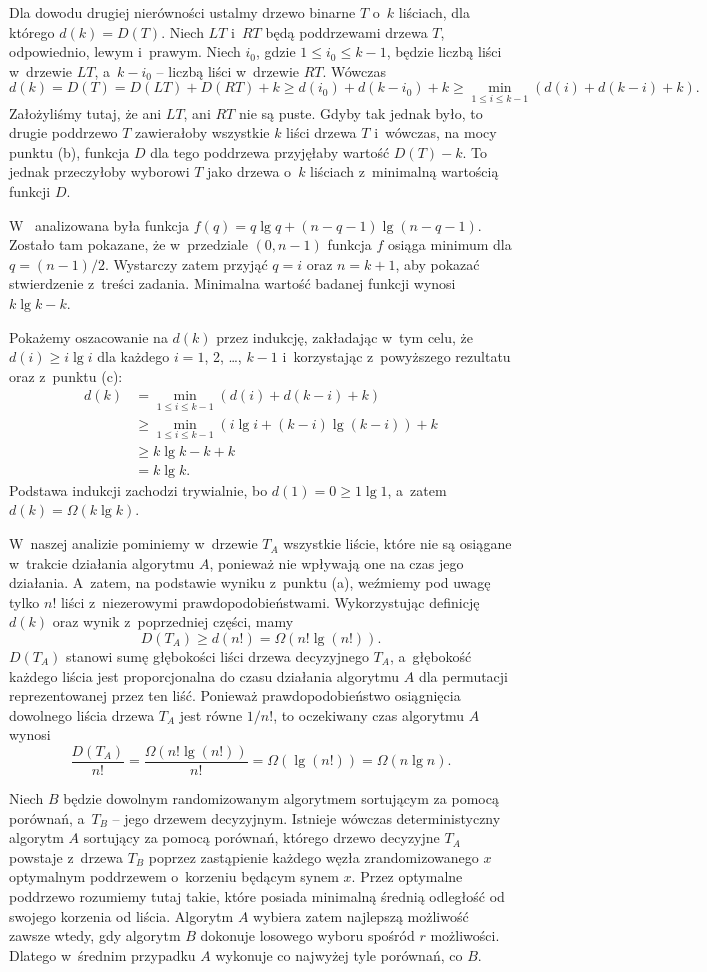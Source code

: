 Dla dowodu drugiej nierówności ustalmy drzewo binarne $T$ o~$k$ liściach, dla którego $d(k)=D(T)$.
Niech $LT$ i~$RT$ będą poddrzewami drzewa $T$, odpowiednio, lewym i~prawym.
Niech $i_0$, gdzie $1\le i_0\le k-1$, będzie liczbą liści w~drzewie $LT$, a~$k-i_0$ -- liczbą liści w~drzewie $RT$.
Wówczas
\[
    d(k) = D(T) = D(LT)+D(RT)+k \ge d(i_0)+d(k-i_0)+k \ge \min_{1\le i\le k-1}(d(i)+d(k-i)+k).
\]
Założyliśmy tutaj, że ani $LT$, ani $RT$ nie są puste.
Gdyby tak jednak było, to drugie poddrzewo $T$ zawierałoby wszystkie $k$ liści drzewa $T$ i~wówczas, na mocy punktu (b), funkcja $D$ dla tego poddrzewa przyjęłaby wartość $D(T)-k$.
To jednak przeczyłoby wyborowi $T$ jako drzewa o~$k$ liściach z~minimalną wartością funkcji $D$.

\subproblem %
W~ analizowana była funkcja $f(q)=q\lg q+(n-q-1)\lg(n-q-1)$.
Zostało tam pokazane, że w~przedziale $(0,n-1)$ funkcja $f$ osiąga minimum dla $q=(n-1)/2$.
Wystarczy zatem przyjąć $q=i$ oraz $n=k+1$, aby pokazać stwierdzenie z~treści zadania.
Minimalna wartość badanej funkcji wynosi $k\lg k-k$.

Pokażemy oszacowanie na $d(k)$ przez indukcję, zakładając w~tym celu, że $d(i)\ge i\lg i$ dla każdego $i=1$, 2, \dots, $k-1$ i~korzystając z~powyższego rezultatu oraz z~punktu (c):
\begin{align*}
	d(k) &= \min_{1\le i\le k-1}(d(i)+d(k-i)+k) \\
	&\ge \min_{1\le i\le k-1}(i\lg i+(k-i)\lg(k-i))+k \\
	&\ge k\lg k-k+k \\
	&= k\lg k.
\end{align*}
Podstawa indukcji zachodzi trywialnie, bo $d(1)=0\ge 1\lg1$, a~zatem $d(k)=\Omega(k\lg k)$.

\subproblem %
W~naszej analizie pominiemy w~drzewie $T_A$ wszystkie liście, które nie są osiągane w~trakcie działania algorytmu $A$, ponieważ nie wpływają one na czas jego działania.
A~zatem, na podstawie wyniku z~punktu (a), weźmiemy pod uwagę tylko $n!$ liści z~niezerowymi prawdopodobieństwami.
Wykorzystując definicję $d(k)$ oraz wynik z~poprzedniej części, mamy
\[
	D(T_A) \ge d(n!) = \Omega(n!\lg(n!)).
\]
$D(T_A)$ stanowi sumę głębokości liści drzewa decyzyjnego $T_A$, a~głębokość każdego liścia jest proporcjonalna do czasu działania algorytmu $A$ dla permutacji reprezentowanej przez ten liść.
Ponieważ prawdopodobieństwo osiągnięcia dowolnego liścia drzewa $T_A$ jest równe $1/n!$, to oczekiwany czas algorytmu $A$ wynosi
\[
	\frac{D(T_A)}{n!} = \frac{\Omega(n!\lg(n!))}{n!} = \Omega(\lg(n!)) = \Omega(n\lg n).
\]

\subproblem %
Niech $B$ będzie dowolnym randomizowanym algorytmem sortującym za pomocą porównań, a~$T_B$ -- jego drzewem decyzyjnym.
Istnieje wówczas deterministyczny algorytm $A$ sortujący za pomocą porównań, którego drzewo decyzyjne $T_A$ powstaje z~drzewa $T_B$ poprzez zastąpienie każdego węzła zrandomizowanego $x$ optymalnym poddrzewem o~korzeniu będącym synem $x$.
Przez optymalne poddrzewo rozumiemy tutaj takie, które posiada minimalną średnią odległość od swojego korzenia od liścia.
Algorytm $A$ wybiera zatem najlepszą możliwość zawsze wtedy, gdy algorytm $B$ dokonuje losowego wyboru spośród $r$ możliwości.
Dlatego w~średnim przypadku $A$ wykonuje co najwyżej tyle porównań, co $B$.
